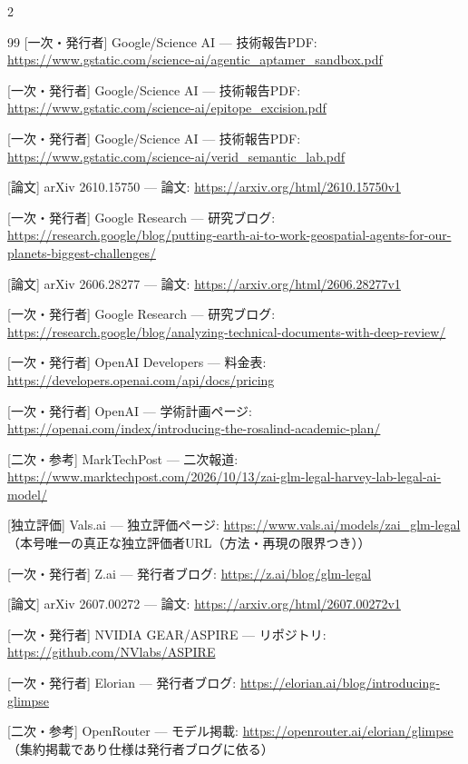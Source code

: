 \documentclass[lualatex,a4paper,10pt]{jlreq}
\begin{document}
\begin{multicols}{2}
\begin{thebibliography}{99}
 [一次・発行者] Google/Science AI — 技術報告PDF: \url{https://www.gstatic.com/science-ai/agentic_aptamer_sandbox.pdf}

 [一次・発行者] Google/Science AI — 技術報告PDF: \url{https://www.gstatic.com/science-ai/epitope_excision.pdf}

 [一次・発行者] Google/Science AI — 技術報告PDF: \url{https://www.gstatic.com/science-ai/verid_semantic_lab.pdf}

 [論文] arXiv 2610.15750 — 論文: \url{https://arxiv.org/html/2610.15750v1}

 [一次・発行者] Google Research — 研究ブログ: \url{https://research.google/blog/putting-earth-ai-to-work-geospatial-agents-for-our-planets-biggest-challenges/}

 [論文] arXiv 2606.28277 — 論文: \url{https://arxiv.org/html/2606.28277v1}

 [一次・発行者] Google Research — 研究ブログ: \url{https://research.google/blog/analyzing-technical-documents-with-deep-review/}

 [一次・発行者] OpenAI Developers — 料金表: \url{https://developers.openai.com/api/docs/pricing}

 [一次・発行者] OpenAI — 学術計画ページ: \url{https://openai.com/index/introducing-the-rosalind-academic-plan/}

 [二次・参考] MarkTechPost — 二次報道: \url{https://www.marktechpost.com/2026/10/13/zai-glm-legal-harvey-lab-legal-ai-model/}

 [独立評価] Vals.ai — 独立評価ページ: \url{https://www.vals.ai/models/zai_glm-legal}（本号唯一の真正な独立評価者URL（方法・再現の限界つき））

 [一次・発行者] Z.ai — 発行者ブログ: \url{https://z.ai/blog/glm-legal}

 [論文] arXiv 2607.00272 — 論文: \url{https://arxiv.org/html/2607.00272v1}

 [一次・発行者] NVIDIA GEAR/ASPIRE — リポジトリ: \url{https://github.com/NVlabs/ASPIRE}

 [一次・発行者] Elorian — 発行者ブログ: \url{https://elorian.ai/blog/introducing-glimpse}

 [二次・参考] OpenRouter — モデル掲載: \url{https://openrouter.ai/elorian/glimpse}（集約掲載であり仕様は発行者ブログに依る）


\end{thebibliography}
\end{multicols}
\end{document}

